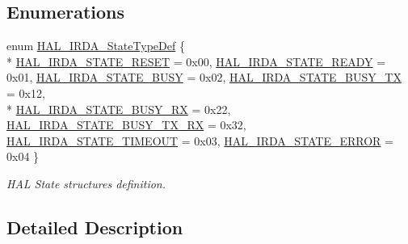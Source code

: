 \subsection*{Enumerations}
\begin{DoxyCompactItemize}
\item 
enum \hyperlink{group___i_r_d_a___exported___types_gab3e65b75c9d4ae39bc50a31222509e1e}{H\+A\+L\+\_\+\+I\+R\+D\+A\+\_\+\+State\+Type\+Def} \{ \\*
\hyperlink{group___i_r_d_a___exported___types_ggab3e65b75c9d4ae39bc50a31222509e1eaa004e82e1ca1d36b3dc84cf9441954dd}{H\+A\+L\+\_\+\+I\+R\+D\+A\+\_\+\+S\+T\+A\+T\+E\+\_\+\+R\+E\+S\+ET} = 0x00, 
\hyperlink{group___i_r_d_a___exported___types_ggab3e65b75c9d4ae39bc50a31222509e1ea9bf218291b1a5ffe624b5a8f891f6244}{H\+A\+L\+\_\+\+I\+R\+D\+A\+\_\+\+S\+T\+A\+T\+E\+\_\+\+R\+E\+A\+DY} = 0x01, 
\hyperlink{group___i_r_d_a___exported___types_ggab3e65b75c9d4ae39bc50a31222509e1ea637e8c6b87e1a3a02616c02a68d781f1}{H\+A\+L\+\_\+\+I\+R\+D\+A\+\_\+\+S\+T\+A\+T\+E\+\_\+\+B\+U\+SY} = 0x02, 
\hyperlink{group___i_r_d_a___exported___types_ggab3e65b75c9d4ae39bc50a31222509e1ea3d8ec588510a501071df3e3d332f9536}{H\+A\+L\+\_\+\+I\+R\+D\+A\+\_\+\+S\+T\+A\+T\+E\+\_\+\+B\+U\+S\+Y\+\_\+\+TX} = 0x12, 
\\*
\hyperlink{group___i_r_d_a___exported___types_ggab3e65b75c9d4ae39bc50a31222509e1ea1df28c166fea4a3a0cab0f1b9fc4dfbc}{H\+A\+L\+\_\+\+I\+R\+D\+A\+\_\+\+S\+T\+A\+T\+E\+\_\+\+B\+U\+S\+Y\+\_\+\+RX} = 0x22, 
\hyperlink{group___i_r_d_a___exported___types_ggab3e65b75c9d4ae39bc50a31222509e1eaad510b2da75a1fa39f5ed1d33472a634}{H\+A\+L\+\_\+\+I\+R\+D\+A\+\_\+\+S\+T\+A\+T\+E\+\_\+\+B\+U\+S\+Y\+\_\+\+T\+X\+\_\+\+RX} = 0x32, 
\hyperlink{group___i_r_d_a___exported___types_ggab3e65b75c9d4ae39bc50a31222509e1ea91524b40055b5b8d642867e4034cfa2f}{H\+A\+L\+\_\+\+I\+R\+D\+A\+\_\+\+S\+T\+A\+T\+E\+\_\+\+T\+I\+M\+E\+O\+UT} = 0x03, 
\hyperlink{group___i_r_d_a___exported___types_ggab3e65b75c9d4ae39bc50a31222509e1eae2e4e8686446bed256ead393fdb34d67}{H\+A\+L\+\_\+\+I\+R\+D\+A\+\_\+\+S\+T\+A\+T\+E\+\_\+\+E\+R\+R\+OR} = 0x04
 \}\begin{DoxyCompactList}\small\item\em H\+AL State structures definition. \end{DoxyCompactList}
\end{DoxyCompactItemize}


\subsection{Detailed Description}


